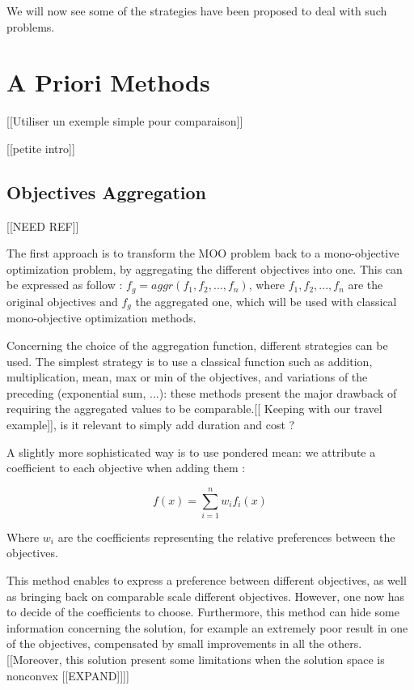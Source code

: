 We will now see some of the strategies have been proposed to deal with such problems.

\section{A Priori Methods}

[[Utiliser un exemple simple pour comparaison]]

[[petite intro]]

\subsection{Objectives Aggregation}

[[NEED REF]]

The first approach is to transform the MOO problem back to a mono-objective optimization problem, by aggregating the different objectives into one. This can be expressed as follow : \(f_g = aggr(f_1, f_2, ..., f_n)\), where \(f_1, f_2, ..., f_n\) are the original objectives and \(f_g\) the aggregated one, which will be used with classical mono-objective optimization methods.

Concerning the choice of the aggregation function, different strategies can be used. The simplest strategy is to use a classical function such as addition, multiplication, mean, max or min of the objectives, and variations of the preceding (exponential sum, ...): these methods present the major drawback of requiring the aggregated values to be comparable.[[ Keeping with our travel example]], is it relevant to simply add duration and cost ?

A slightly more sophisticated way is to use pondered mean: we attribute a coefficient to each objective when adding them :

\[ f(x) =\sum_{i=1}^n w_i f_i(x) \]

Where $w_i$ are the coefficients representing the relative preferences between the objectives.

This method enables to express a preference between different objectives, as well as bringing back on comparable scale different objectives. However, one now has to decide of the coefficients to choose. Furthermore, this method can hide some information concerning the solution, for example an extremely poor result in one of the objectives, compensated by small improvements in all the others.  [[Moreover, this solution present some limitations when the solution space is nonconvex [[EXPAND]]]]

